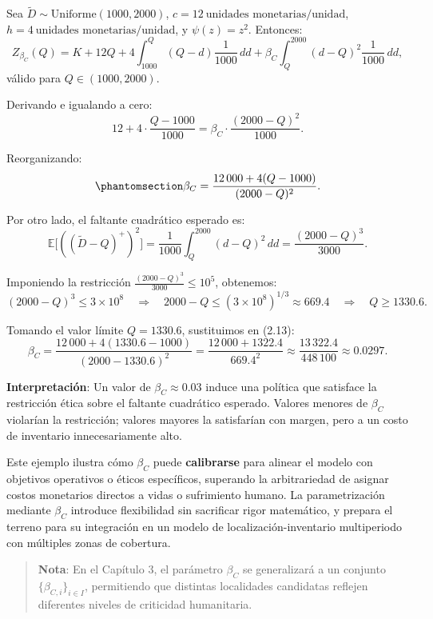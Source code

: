 \documentclass[
  spanish,
  us-letterpaper,
  DIV=11,
  numbers=noendperiod]{scrreprt}
\numberwithin{equation}{section}
\begin{document}
Sea \(\tilde{D} \sim \text{Uniforme}(1000, 2000)\),
\(c = 12~\text{unidades monetarias/unidad}\),
\(h = 4~\text{unidades monetarias/unidad}\), y \(\psi(z) = z^2\).
Entonces: \[
Z_{\beta_C}(Q) = K + 12Q + 4 \int_{1000}^Q (Q - d) \frac{1}{1000} \, dd + \beta_C \int_Q^{2000} (d - Q)^2 \frac{1}{1000} \, dd,
\] válido para \(Q \in (1000, 2000)\).

Derivando e igualando a cero: \[
12 + 4 \cdot \frac{Q - 1000}{1000} = \beta_C \cdot \frac{(2000 - Q)^2}{1000}.
\]

Reorganizando: \begin{equation}\phantomsection\label{eq-reo}{
\beta_C = \frac{12\,000 + 4(Q - 1000)}{(2000 - Q)^2}.
}\end{equation}

Por otro lado, el faltante cuadrático esperado es: \[
\mathbb{E}\big[((\tilde{D} - Q)^+)^2\big] = \frac{1}{1000} \int_Q^{2000} (d - Q)^2 \, dd = \frac{(2000 - Q)^3}{3000}.
\]

Imponiendo la restricción \(\frac{(2000 - Q)^3}{3000} \leq 10^5\),
obtenemos: \[
(2000 - Q)^3 \leq 3 \times 10^8 \quad \Rightarrow \quad 2000 - Q \leq (3 \times 10^8)^{1/3} \approx 669.4 \quad \Rightarrow \quad Q \geq 1330.6.
\]

Tomando el valor límite \(Q = 1330.6\), sustituimos en (2.13): \[
\beta_C = \frac{12\,000 + 4(1330.6 - 1000)}{(2000 - 1330.6)^2} = \frac{12\,000 + 1322.4}{669.4^2} \approx \frac{13\,322.4}{448\,100} \approx 0.0297.
\]

\textbf{Interpretación}: Un valor de \(\beta_C \approx 0.03\) induce una
política que satisface la restricción ética sobre el faltante cuadrático
esperado. Valores menores de \(\beta_C\) violarían la restricción;
valores mayores la satisfarían con margen, pero a un costo de inventario
innecesariamente alto.

Este ejemplo ilustra cómo \(\beta_C\) puede \textbf{calibrarse} para
alinear el modelo con objetivos operativos o éticos específicos,
superando la arbitrariedad de asignar costos monetarios directos a vidas
o sufrimiento humano. La parametrización mediante \(\beta_C\) introduce
flexibilidad sin sacrificar rigor matemático, y prepara el terreno para
su integración en un modelo de localización-inventario multiperiodo con
múltiples zonas de cobertura.

\begin{quote}
\textbf{Nota}: En el Capítulo 3, el parámetro \(\beta_C\) se
generalizará a un conjunto \(\{\beta_{C,i}\}_{i \in I}\), permitiendo
que distintas localidades candidatas reflejen diferentes niveles de
criticidad humanitaria.
\end{quote}
\end{document}
